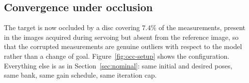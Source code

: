 %
%
%
%
%

\subsection{Convergence under occlusion}
\label{sec:ablation-results}

The target is now occluded by a disc covering $7.4\%$ of the measurements,
present in the images acquired during servoing but absent from the reference
image, so that the corrupted measurements are genuine outliers with respect to
the model rather than a change of goal. Figure~\ref{fig:occ-setup} shows the
configuration. Everything else is as in Section~\ref{sec:nominal}: same initial
and desired poses, same bank, same gain schedule, same iteration cap.

